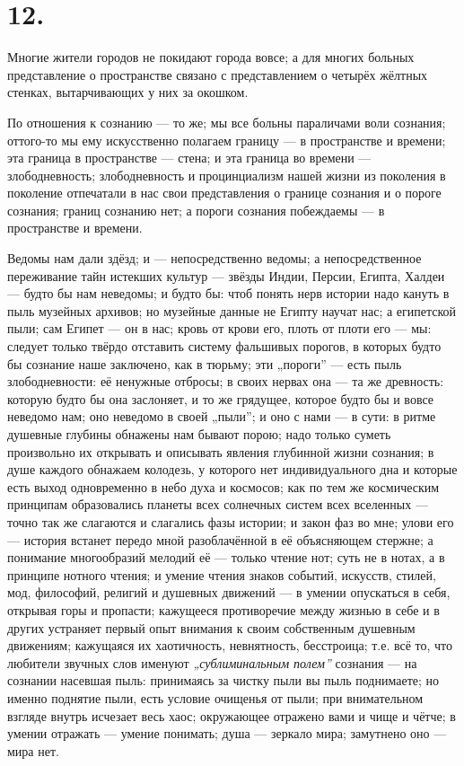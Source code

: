 \documentclass[12pt,a4paper,oneside]{book}
\begin{document}
\section*{12.}

Многие жители городов не покидают города вовсе; а для многих больных представление о пространстве связано с представлением о четырёх жёлтных стенках, вытарчивающих у них за окошком.

По отношения к сознанию — то же; мы все больны параличами воли сознания; оттого-то мы ему искусственно полагаем границу — в пространстве и времени; эта граница в пространстве — стена; и эта граница во времени — злободневность; злободневность и процинциализм нашей жизни из поколения в поколение отпечатали в нас свои представления о границе сознания и о пороге сознания; границ сознанию нет; а пороги сознания побеждаемы — в пространстве и времени.

Ведомы нам дали здёзд; и — непосредственно ведомы; а непосредственное переживание тайн истекших культур — звёзды Индии, Персии, Египта, Халдеи — будто бы нам неведомы; и будто бы: чтоб понять нерв истории надо кануть в пыль музейных архивов; но музейные данные не Египту научат нас; а египетской пыли; сам Египет — он в нас; кровь от крови его, плоть от плоти его — мы: следует только твёрдо отставить систему фальшивых порогов, в которых будто бы сознание наше заключено, как в тюрьму; эти „пороги” — есть пыль злободневности: её ненужные отбросы; в своих нервах она — та же древность: которую будто бы она заслоняет, и то же грядущее, которое будто бы и вовсе неведомо нам; оно неведомо в своей „пыли”; и оно с нами — в сути: в ритме душевные глубины обнажены нам бывают порою; надо только суметь произвольно их открывать и описывать явления глубинной жизни сознания; в душе каждого обнажаем колодезь, у которого нет индивидуального дна и которые есть выход одновременно в небо духа и космосов; как по тем же космическим принципам образовались планеты всех солнечных систем всех вселенных — точно так же слагаются и слагались фазы истории; и закон фаз во мне; улови его — история встанет передо мной разоблачённой в её объясняющем стержне; а понимание многообразий мелодий её — только чтение нот; суть не в нотах, а в принципе нотного чтения; и умение чтения знаков событий, искусств, стилей, мод, философий, религий и душевных движений — в умении опускаться в себя, открывая горы и пропасти; кажущееся противоречие между жизнью в себе и в других устраняет первый опыт внимания к своим собственным душевным движениям; кажущаяся их хаотичность, невнятность, бесстроица; т.е. всё то, что любители звучных слов именуют \emph{„сублиминальным полем”} сознания — на сознании насевшая пыль: принимаясь за чистку пыли вы пыль поднимаете; но именно поднятие пыли, есть условие очищенья от пыли; при внимательном взгляде внутрь исчезает весь хаос; окружающее отражено вами и чище и чётче; в умении отражать — умение понимать; душа — зеркало мира; замутнено оно — мира нет.
\end{document}
